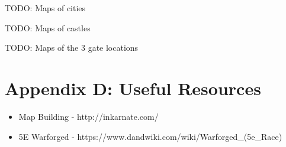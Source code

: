 \documentclass[10pt,twoside,twocolumn]{article}
\begin{document}
\clearpage

TODO: Maps of cities

TODO: Maps of castles

TODO: Maps of the 3 gate locations

\section{Appendix D: Useful Resources}

\begin{itemize}
\item Map Building - http://inkarnate.com/
\item 5E Warforged - https://www.dandwiki.com/wiki/Warforged\_(5e\_Race)
\end{itemize}

\end{document}

